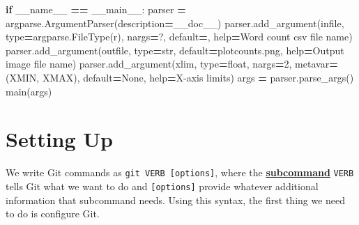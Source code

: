 \documentclass[
]{krantz}
\makeatletter
\newenvironment{Shaded}{\begin{snugshade}}{\end{snugshade}}
\newcommand{\BuiltInTok}[1]{#1}
\newcommand{\ControlFlowTok}[1]{\textcolor[rgb]{0.13,0.29,0.53}{\textbf{#1}}}
\newcommand{\DecValTok}[1]{\textcolor[rgb]{0.00,0.00,0.81}{#1}}
\newcommand{\NormalTok}[1]{#1}
\newcommand{\OperatorTok}[1]{\textcolor[rgb]{0.81,0.36,0.00}{\textbf{#1}}}
\newcommand{\StringTok}[1]{\textcolor[rgb]{0.31,0.60,0.02}{#1}}
\newcommand{\VariableTok}[1]{\textcolor[rgb]{0.00,0.00,0.00}{#1}}
\newenvironment{kframe}{%
\medskip{}
\setlength{\fboxsep}{.8em}
 \def\at@end@of@kframe{}%
 \ifinner\ifhmode%
  \def\at@end@of@kframe{\end{minipage}}%
  \begin{minipage}{\columnwidth}%
 \fi\fi%
 \def\FrameCommand##1{\hskip\@totalleftmargin \hskip-\fboxsep
 \colorbox{shadecolor}{##1}\hskip-\fboxsep
     \hskip-\linewidth \hskip-\@totalleftmargin \hskip\columnwidth}%
 \MakeFramed {\advance\hsize-\width
   \@totalleftmargin\z@ \linewidth\hsize
   \@setminipage}}%
 {\par\unskip\endMakeFramed%
 \at@end@of@kframe}
\renewenvironment{Shaded}{\begin{kframe}}{\end{kframe}}
\newcommand{\gref}[2]{\hyperlink{#2}{\textbf{#1}}}
\makeatother
\begin{document}
\begin{Shaded}
\begin{Highlighting}[]
\ControlFlowTok{if} \VariableTok{\_\_name\_\_} \OperatorTok{==} \StringTok{\textquotesingle{}\_\_main\_\_\textquotesingle{}}\NormalTok{:}
\NormalTok{    parser }\OperatorTok{=}\NormalTok{ argparse.ArgumentParser(description}\OperatorTok{=}\NormalTok{\_\_doc\_\_)}
\NormalTok{    parser.add\_argument(}\StringTok{\textquotesingle{}infile\textquotesingle{}}\NormalTok{, }\BuiltInTok{type}\OperatorTok{=}\NormalTok{argparse.FileType(}\StringTok{\textquotesingle{}r\textquotesingle{}}\NormalTok{), nargs}\OperatorTok{=}\StringTok{\textquotesingle{}?\textquotesingle{}}\NormalTok{,}
\NormalTok{                        default}\OperatorTok{=}\StringTok{\textquotesingle{}{-}\textquotesingle{}}\NormalTok{, }\BuiltInTok{help}\OperatorTok{=}\StringTok{\textquotesingle{}Word count csv file name\textquotesingle{}}\NormalTok{)}
\NormalTok{    parser.add\_argument(}\StringTok{\textquotesingle{}{-}{-}outfile\textquotesingle{}}\NormalTok{, }\BuiltInTok{type}\OperatorTok{=}\BuiltInTok{str}\NormalTok{, default}\OperatorTok{=}\StringTok{\textquotesingle{}plotcounts.png\textquotesingle{}}\NormalTok{,}
                        \BuiltInTok{help}\OperatorTok{=}\StringTok{\textquotesingle{}Output image file name\textquotesingle{}}\NormalTok{)}
\NormalTok{    parser.add\_argument(}\StringTok{\textquotesingle{}{-}{-}xlim\textquotesingle{}}\NormalTok{, }\BuiltInTok{type}\OperatorTok{=}\BuiltInTok{float}\NormalTok{, nargs}\OperatorTok{=}\DecValTok{2}\NormalTok{, metavar}\OperatorTok{=}\NormalTok{(}\StringTok{\textquotesingle{}XMIN\textquotesingle{}}\NormalTok{, }\StringTok{\textquotesingle{}XMAX\textquotesingle{}}\NormalTok{),}
\NormalTok{                        default}\OperatorTok{=}\VariableTok{None}\NormalTok{, }\BuiltInTok{help}\OperatorTok{=}\StringTok{\textquotesingle{}X{-}axis limits\textquotesingle{}}\NormalTok{)}
\NormalTok{    args }\OperatorTok{=}\NormalTok{ parser.parse\_args()}
\NormalTok{    main(args)}
\end{Highlighting}
\end{Shaded}

\hypertarget{git-cmdline-setup}{%
\section{Setting Up}\label{git-cmdline-setup}}

We write Git commands as \texttt{git\ VERB\ {[}options{]}},
where the \gref{subcommand}{subcommand} \texttt{VERB} tells Git what we want to do
and \texttt{{[}options{]}} provide whatever additional information that subcommand needs.
Using this syntax,
the first thing we need to do is configure Git.
\end{document}
